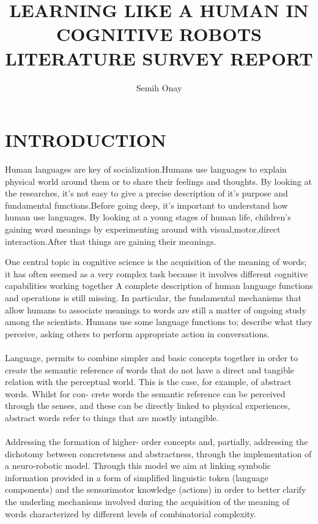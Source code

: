 \documentclass[12pt]{report}
\title{LEARNING LIKE A HUMAN IN COGNITIVE ROBOTS \\ LITERATURE SURVEY REPORT}
\author{Semih Onay}
\begin{document}
\makecstitle

\chapter{INTRODUCTION}

Human languages are key of socialization.Humans use languages to explain physical world around them or to share their feelings and thoughts.
By looking at the researches, it's not easy to give a precise description of it's purpose and fundamental functions.Before going deep, it's important to understand how human use languages.
By looking at a young stages of human life, children's gaining word meanings by experimenting around with visual,motor,direct interaction.After that things are gaining their meanings.

One central topic in cognitive science is the acquisition of the meaning of words; it has often seemed as a very complex task because it involves different cognitive capabilities working together   
A complete description of human language functions and operations is still missing. In particular, the fundamental mechanisms that allow humans to associate meanings to words are still a matter of ongoing study among the scientists. 
Humans use some language functions to; describe what they perceive, asking others to perform appropriate action in conversations.\\\\
Language, permits to combine simpler and basic concepts together in order to create the semantic reference of words that do not have a direct and tangible relation with the perceptual world. This is the case, for example, of abstract words. Whilst for con- crete words the semantic reference can be perceived through the senses, and these can be directly linked to physical experiences, abstract words refer to things that are mostly intangible.\\\\
Addressing the formation of higher- order concepts and, partially, addressing the dichotomy between concreteness and abstractness, through the implementation of a neuro-robotic model. Through this model we aim at linking symbolic information provided in a form of simplified linguistic token (language components) and the sensorimotor knowledge (actions) in order to better clarify the underling mechanisms involved during the acquisition of the meaning of words characterized by different levels of combinatorial complexity.
\end{document}
